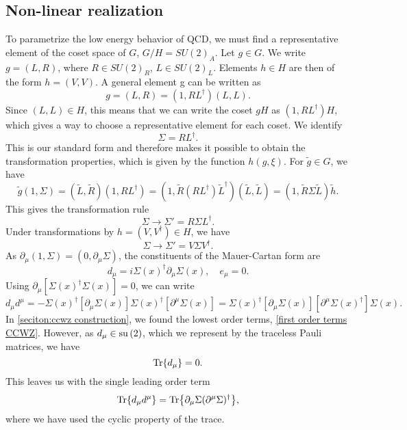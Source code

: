 \subsection*{Non-linear realization}

To parametrize the low energy behavior of QCD, we must find a representative element of the coset space of $G$, $G/H = SU(2)_A$.
Let $g\in G$. 
We write $g = (L, R)$, where $R \in SU(2)_R$, $L \in SU(2)_L$.
Elements $h \in H$ are then of the form $h = (V, V)$.
A general element g can be written as
\begin{equation}
    g = (L, R) = (1, R L^\dagger) (L, L).
\end{equation}
Since $(L, L) \in H$, this means that we can write the coset $g H$ as $(1, R L^\dagger)H$, which gives a way to choose a representative element for each coset.
We identify
\begin{equation}
    \Sigma = R L^\dagger. 
\end{equation}
This is our standard form and therefore makes it possible to obtain the transformation properties, which is given by the function $h(g, \xi)$.
For $\tilde g \in G$, we have 
\begin{equation}
    \tilde g (1, \Sigma)
    = (\tilde L, \tilde R) (1, R L^\dagger)
    = (1, \tilde R (R L^\dagger) \tilde L^\dagger) (\tilde L, \tilde L)
    = (1, \tilde R \Sigma \tilde L) \tilde h.
\end{equation}
This gives the transformation rule
\begin{equation}
    \Sigma \rightarrow \Sigma' = R \Sigma L^\dagger.
\end{equation}
Under transformations by $h = (V, V^\dagger) \in H$, we have
\begin{equation}
    \Sigma \rightarrow \Sigma' = V \Sigma V^\dagger.
\end{equation}
As $\partial_\mu  (1, \Sigma) = (0, \partial_\mu \Sigma)$, the constituents of the Mauer-Cartan form are
\begin{equation}
    d_\mu = i \Sigma(x)^\dagger \partial_\mu \Sigma(x),\quad
    e_\mu = 0.
\end{equation}
Using $\partial_\mu [\Sigma(x)^\dagger\Sigma(x)] = 0 $, we can write
\begin{equation}
    d_\mu d^\mu = 
    - \Sigma(x)^\dagger [\partial_\mu \Sigma(x)] \Sigma(x)^\dagger [\partial^\mu \Sigma(x)]
    =\Sigma(x)^\dagger [\partial_\mu \Sigma(x)] [\partial^\mu \Sigma(x)^\dagger] \Sigma(x).
\end{equation}
In \autoref{seciton:ccwz construction}, we found the lowest order terms, \cref{first order terms CCWZ}.
However, as $d_\mu \in \mathrm{su}\left(2\right)$, which we represent by the traceless Pauli matrices, we have
\begin{equation}
    \Tr{d_\mu} = 0.
\end{equation}
This leaves us with the single leading order term
\begin{equation}
    \Tr{d_\mu d^\mu} = \Tr{\partial_\mu \Sigma (\partial^\mu \Sigma)^\dagger},
\end{equation}
where we have used the cyclic property of the trace.

